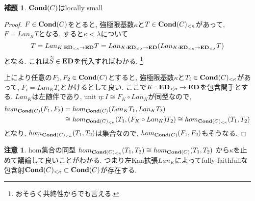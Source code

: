 \documentclass[dvipdfmx,a4paper,11pt]{article}
\theoremstyle{definition}
\newtheorem{lem}[thm]{補題}
\newtheorem{rem}[thm]{注意}
\begin{document}
\begin{tcolorbox}
 [colback = white, colframe = green!35!black, fonttitle = \bfseries,breakable = true]
\begin{lem}
${\bf Cond}(C)$はlocally small
\end{lem}
 \end{tcolorbox}
\begin{proof}
$F \in {\bf Cond}(C)$をとると, 強極限基数$\kappa$と$T \in {\bf Cond}(C)_{< \kappa}$があって, $F = Lan_{K}T$となる. 
すると$\kappa < \lambda$について
$$T = Lan_{K: {\bf ED}_{< \kappa} \to {\bf ED}}T 
= Lan_{K: {\bf ED}_{< \lambda } \to {\bf ED}} (Lan_{K: {\bf ED}_{< \kappa} \to {\bf ED}_{< \lambda}}T)$$
となる. これは$\widetilde{S} \in {\bf ED}$を代入すればわかる. \footnote{おそらく共終性からでも言える. }

上により任意の$F_1, F_2 \in {\bf Cond}(C)$とすると, 強極限基数$\kappa$と$T_i \in {\bf Cond}(C)_{< \kappa}$があって, $F_i = Lan_{K}T_i$とかけるとして良い. 
ここで$K : {\bf ED}_{< \kappa} \to {\bf ED}$を包含関手とする.
$ Lan_{K}$は左随伴であり, unit $\eta: I \cong F_{K} \circ Lan_{K} $が同型なので, 
\begin{align*}
\begin{split}
hom_{{\bf Cond}(C)}(F_1, F_2)
&=
hom_{{\bf Cond}(C)}( Lan_{K}T_1,  Lan_{K}T_2)\\
&\cong
hom_{{\bf Cond}(C)_{<\kappa}}(T_1,  (F_{K} \circ Lan_{K})T_2)
\cong 
hom_{{\bf Cond}(C)_{<\kappa}}(T_1, T_2)
\end{split}
\end{align*}
となり, $hom_{{\bf Cond}(C)_{<\kappa}}(T_1, T_2)$は集合なので, $hom_{{\bf Cond}(C)}(F_1, F_2)$もそうなる. 
\end{proof}

\begin{rem}
hom集合の同型
$hom_{{\bf Cond}(C)_{<\kappa}}(T_1,  T_2)
\cong 
hom_{{\bf Cond}(C)}(T_1, T_2)$
から$\kappa$を止めて議論して良いことがわかる.
つまり左Kan拡張$Lan_{K}$によってfully-faithfullな包含射${\bf Cond}(C)_{< \kappa} \subset {\bf Cond}(C)$が存在する. 
\end{rem}
\end{document}
